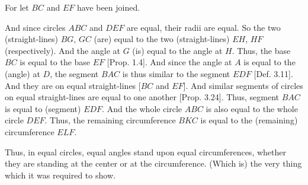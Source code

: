\begin{Parallel}{}{}
{For let $BC$ and $EF$ have been joined.

And since circles $ABC$ and $DEF$ are equal, their radii are equal.
So the two (straight-lines) $BG$, $GC$ (are) equal to the two (straight-lines)
$EH$, $HF$ (respectively). And the angle at $G$ (is) equal to the angle at $H$.
Thus, the base $BC$ is equal to the base $EF$ [Prop. 1.4].
And since the angle at $A$ is equal to the (angle) at $D$, the segment $BAC$ is
thus similar to the segment $EDF$ [Def. 3.11]. And they are on
equal straight-lines [$BC$ and $EF$]. And similar segments of circles on equal
straight-lines are equal to one another [Prop. 3.24]. Thus, segment
$BAC$ is equal to (segment) $EDF$. And the whole circle $ABC$ is also
equal to the whole circle $DEF$. Thus, the remaining circumference $BKC$
is equal to the (remaining) circumference $ELF$.

Thus,   in equal circles, equal angles stand upon equal circumferences, whether they
are standing  at the center or at the circumference. (Which is)
the very thing which it was required to show.}
\end{Parallel}

